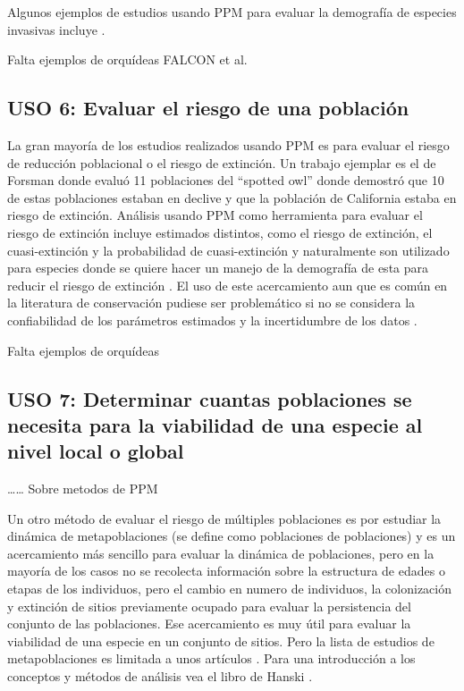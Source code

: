 \documentclass[
]{book}
\theoremstyle{definition}
\theoremstyle{definition}
\theoremstyle{definition}
\theoremstyle{definition}
\theoremstyle{remark}
\begin{document}
Algunos ejemplos de estudios usando PPM para evaluar la demografía de especies invasivas incluye \citep{koop2005projection, mcmahon2008transient, li2015demographic}.

Falta ejemplos de orquídeas FALCON et al.~

\subsection{USO 6: Evaluar el riesgo de una población}\label{uso-6-evaluar-el-riesgo-de-una-poblaciuxf3n}

La gran mayoría de los estudios realizados usando PPM es para evaluar el riesgo de reducción poblacional o el riesgo de extinción. Un trabajo ejemplar es el de Forsman \citep{forsman1996demography} donde evaluó 11 poblaciones del ``spotted owl'' donde demostró que 10 de estas poblaciones estaban en declive y que la población de California estaba en riesgo de extinción. Análisis usando PPM como herramienta para evaluar el riesgo de extinción incluye estimados distintos, como el riesgo de extinción, el cuasi-extinción y la probabilidad de cuasi-extinción y naturalmente son utilizado para especies donde se quiere hacer un manejo de la demografía de esta para reducir el riesgo de extinción \citep{crone2011plant, semmens2016quasi}. El uso de este acercamiento aun que es común en la literatura de conservación pudiese ser problemático si no se considera la confiabilidad de los parámetros estimados y la incertidumbre de los datos \citep{ludwig1999meaningful}.

Falta ejemplos de orquídeas

\subsection{USO 7: Determinar cuantas poblaciones se necesita para la viabilidad de una especie al nivel local o global}\label{uso-7-determinar-cuantas-poblaciones-se-necesita-para-la-viabilidad-de-una-especie-al-nivel-local-o-global}

\ldots\ldots{} Sobre metodos de PPM

Un otro método de evaluar el riesgo de múltiples poblaciones es por estudiar la dinámica de metapoblaciones (se define como poblaciones de poblaciones) y es un acercamiento más sencillo para evaluar la dinámica de poblaciones, pero en la mayoría de los casos no se recolecta información sobre la estructura de edades o etapas de los individuos, pero el cambio en numero de individuos, la colonización y extinción de sitios previamente ocupado para evaluar la persistencia del conjunto de las poblaciones. Ese acercamiento es muy útil para evaluar la viabilidad de una especie en un conjunto de sitios. Pero la lista de estudios de metapoblaciones es limitada a unos artículos \citep{tremblay2006epiphytic, lind2007metapopulation, winkler2009population, kindlmann2014disobedient, acevedo2015spatial, acevedo2020local, vsvecova2023difficulties}. Para una introducción a los conceptos y métodos de análisis vea el libro de Hanski \citep{hanski1999metapopulation}.
\end{document}
